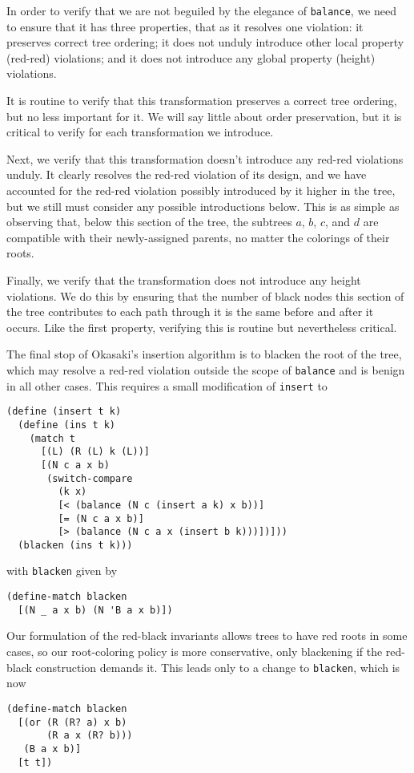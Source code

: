 \documentclass[preprint]{sigplanconf}
\begin{document}
In order to verify that we are not beguiled by the elegance of \texttt{balance}, we need to ensure that it has three properties, that as it resolves one violation: it preserves correct tree ordering; it does not unduly introduce other local property (red-red) violations; and it does not introduce any global property (height) violations.

It is routine to verify that this transformation preserves a correct tree ordering, but no less important for it. We will say little about order preservation, but it is critical to verify for each transformation we introduce.

Next, we verify that this transformation doesn't introduce any red-red violations unduly. It clearly resolves the red-red violation of its design, and we have accounted for the red-red violation possibly introduced by it higher in the tree, but we still must consider any possible introductions below. This is as simple as observing that, below this section of the tree, the subtrees $a$, $b$, $c$, and $d$ are compatible with their newly-assigned parents, no matter the colorings of their roots.

Finally, we verify that the transformation does not introduce any height violations. We do this by ensuring that the number of black nodes this section of the tree contributes to each path through it is the same before and after it occurs. Like the first property, verifying this is routine but nevertheless critical.

The final stop of Okasaki's insertion algorithm is to blacken the root of the tree, which may resolve a red-red violation outside the scope of \texttt{balance} and is benign in all other cases. This requires a small modification of \texttt{insert} to 
\begin{verbatim}
(define (insert t k)
  (define (ins t k)
    (match t
      [(L) (R (L) k (L))]
      [(N c a x b)
       (switch-compare
         (k x)
         [< (balance (N c (insert a k) x b))]
         [= (N c a x b)]
         [> (balance (N c a x (insert b k)))])]))
  (blacken (ins t k)))
\end{verbatim}
with \texttt{blacken} given by
\begin{verbatim}
(define-match blacken
  [(N _ a x b) (N 'B a x b)])
\end{verbatim}

Our formulation of the red-black invariants allows trees to have red roots in some cases, so our root-coloring policy is more conservative, only blackening if the red-black construction demands it. This leads only to a change to \texttt{blacken}, which is now
\begin{verbatim}
(define-match blacken
  [(or (R (R? a) x b)
       (R a x (R? b)))
   (B a x b)]
  [t t])
\end{verbatim}
\end{document}
